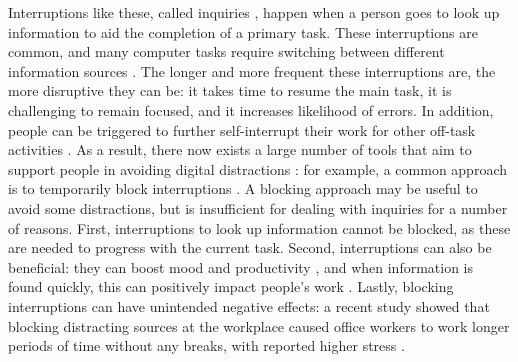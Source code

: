 Interruptions like these, called inquiries \citep{Jin2009}, happen when a person goes to look up information to aid the completion of a primary task. These interruptions are common, and many computer tasks require switching between different information sources \citep{Cangiano2009}. The longer and more frequent these interruptions are, the more disruptive they can be: it takes time to resume the main task, it is challenging to remain focused, and it increases likelihood of errors. In addition, people can be triggered to further self-interrupt their work for other off-task activities \citep{Jin2009}. As a result, there now exists a large number of tools that aim to support people in avoiding digital distractions \citep{Lyngs2018}: for example, a common approach is to temporarily block interruptions \citep{Kim2017}. A blocking approach may be useful to avoid some distractions, but is insufficient for dealing with inquiries for a number of reasons. First, interruptions to look up information cannot be blocked, as these are needed to progress with the current task. Second, interruptions can also be beneficial: they can boost mood and productivity \citep{Mark2014a}, and when information is found quickly, this can positively impact people’s work \citep{Jin2009}. Lastly, blocking interruptions can have unintended negative effects: a recent study showed that blocking distracting sources at the workplace caused office workers to work longer periods of time without any breaks, with reported higher stress \citep{Mark2018}.

